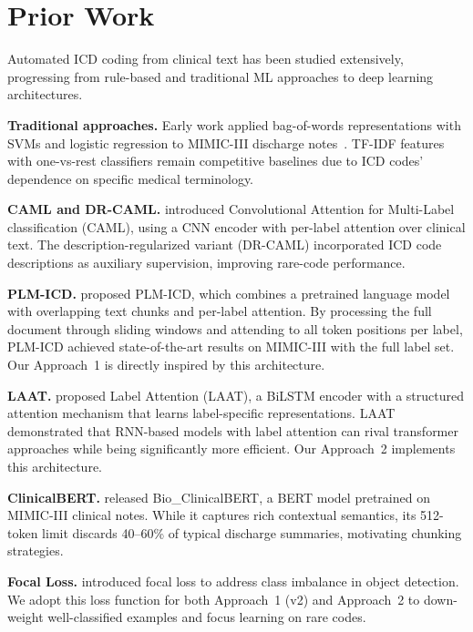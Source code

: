 \documentclass[11pt,a4paper]{article}
\begin{document}
\section{Prior Work}

Automated ICD coding from clinical text has been studied extensively, progressing from rule-based and traditional ML approaches to deep learning architectures.

\textbf{Traditional approaches.}
Early work applied bag-of-words representations with SVMs and logistic regression to MIMIC-III discharge notes~\cite{perotte2014diagnosis}. TF-IDF features with one-vs-rest classifiers remain competitive baselines due to ICD codes' dependence on specific medical terminology.

\textbf{CAML and DR-CAML.}
\citet{mullenbach2018explainable} introduced Convolutional Attention for Multi-Label classification (CAML), using a CNN encoder with per-label attention over clinical text. The description-regularized variant (DR-CAML) incorporated ICD code descriptions as auxiliary supervision, improving rare-code performance.

\textbf{PLM-ICD.}
\citet{huang2022plmicd} proposed PLM-ICD, which combines a pretrained language model with overlapping text chunks and per-label attention. By processing the full document through sliding windows and attending to all token positions per label, PLM-ICD achieved state-of-the-art results on MIMIC-III with the full label set. Our Approach~1 is directly inspired by this architecture.

\textbf{LAAT.}
\citet{vu2020label} proposed Label Attention (LAAT), a BiLSTM encoder with a structured attention mechanism that learns label-specific representations. LAAT demonstrated that RNN-based models with label attention can rival transformer approaches while being significantly more efficient. Our Approach~2 implements this architecture.

\textbf{ClinicalBERT.}
\citet{alsentzer2019publicly} released Bio\_ClinicalBERT, a BERT model pretrained on MIMIC-III clinical notes. While it captures rich contextual semantics, its 512-token limit discards 40--60\% of typical discharge summaries, motivating chunking strategies.

\textbf{Focal Loss.}
\citet{lin2017focal} introduced focal loss to address class imbalance in object detection. We adopt this loss function for both Approach~1 (v2) and Approach~2 to down-weight well-classified examples and focus learning on rare codes.
\end{document}
